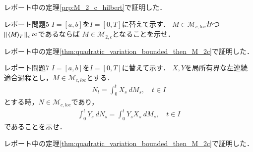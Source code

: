 \begin{prf}
	レポート中の定理\ref{prp:M_2_c_hilbert}で証明した．
	\QED
\end{prf}

\newpage
\begin{itembox}[l]{レポート問題5}
	$I = [a,b]$を$I = [0,T]$に替えて示す．
	$M \in \mathcal{M}_{c,loc}$かつ$\Norm{\inprod<M>_T} < \infty$であるならば
	$M \in \mathcal{M}_{2,c}$となることを示せ．
\end{itembox}

\begin{prf}
	レポート中の定理\ref{thm:quadratic_variation_bounded_then_M_2c}で証明した．
	\QED
\end{prf}

\newpage
\begin{itembox}[l]{レポート問題7}
	$I = [a,b]$を$I = [0,T]$に替えて示す．
	$X,Y$を局所有界な左連続適合過程とし，$M \in \mathcal{M}_{c,loc}$とする．
	\begin{align}
		N_t = \int_0^t X_s\ dM_s,
		\quad t \in I
	\end{align}
	とする時，$N \in \mathcal{M}_{c,loc}$であり，
	\begin{align}
		\int_0^t Y_s\ dN_s = \int_0^t Y_s X_s\ dM_s,
		\quad t \in I
	\end{align}
	であることを示せ．
\end{itembox}

\begin{prf}
	レポート中の定理\ref{thm:quadratic_variation_bounded_then_M_2c}で証明した．
	\QED
\end{prf}
\newpage